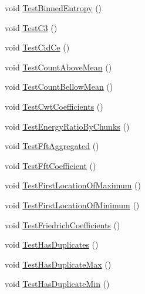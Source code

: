\begin{DoxyCompactItemize}
void \mbox{\hyperlink{classkhiva_1_1features_1_1tests_1_1_features_tests_aaf8462c5c69cbccec585ba6d4db466c4}{Test\+Binned\+Entropy}} ()
\item 
void \mbox{\hyperlink{classkhiva_1_1features_1_1tests_1_1_features_tests_af5f3a7f86324b5021d03266a97ea4935}{Test\+C3}} ()
\item 
void \mbox{\hyperlink{classkhiva_1_1features_1_1tests_1_1_features_tests_aced6b4f866c47c52d54c31dd540336b0}{Test\+Cid\+Ce}} ()
\item 
void \mbox{\hyperlink{classkhiva_1_1features_1_1tests_1_1_features_tests_a1c4531b9f4a2d4517772c67a7567a609}{Test\+Count\+Above\+Mean}} ()
\item 
void \mbox{\hyperlink{classkhiva_1_1features_1_1tests_1_1_features_tests_a2c56c2fbd90c545bfd5ca49c32073c0d}{Test\+Count\+Bellow\+Mean}} ()
\item 
void \mbox{\hyperlink{classkhiva_1_1features_1_1tests_1_1_features_tests_a6a5bdcc5e0cb17a89dab77b3f730a99d}{Test\+Cwt\+Coefficients}} ()
\item 
void \mbox{\hyperlink{classkhiva_1_1features_1_1tests_1_1_features_tests_ab77e9561c77d20e7a1062f6a4bdfbf2c}{Test\+Energy\+Ratio\+By\+Chunks}} ()
\item 
void \mbox{\hyperlink{classkhiva_1_1features_1_1tests_1_1_features_tests_ae34de6e83714e5da8810988664149b62}{Test\+Fft\+Aggregated}} ()
\item 
void \mbox{\hyperlink{classkhiva_1_1features_1_1tests_1_1_features_tests_a4c173947fd8938ffb388badccac937d6}{Test\+Fft\+Coefficient}} ()
\item 
void \mbox{\hyperlink{classkhiva_1_1features_1_1tests_1_1_features_tests_a85f6553aca92db824383cdded5a4f211}{Test\+First\+Location\+Of\+Maximum}} ()
\item 
void \mbox{\hyperlink{classkhiva_1_1features_1_1tests_1_1_features_tests_af045e5c50dc093d9fda1a4434345e098}{Test\+First\+Location\+Of\+Minimum}} ()
\item 
void \mbox{\hyperlink{classkhiva_1_1features_1_1tests_1_1_features_tests_a59288a7aa65107014a1f5088aafd50b7}{Test\+Friedrich\+Coefficients}} ()
\item 
void \mbox{\hyperlink{classkhiva_1_1features_1_1tests_1_1_features_tests_a28b1f0dae64f93dbf7ff4e0ed25c7d10}{Test\+Has\+Duplicates}} ()
\item 
void \mbox{\hyperlink{classkhiva_1_1features_1_1tests_1_1_features_tests_ad72a83083060a305e82b6d08cd39a23c}{Test\+Has\+Duplicate\+Max}} ()
\item 
void \mbox{\hyperlink{classkhiva_1_1features_1_1tests_1_1_features_tests_a1f3ea2c6e586090d937f17a268e1086a}{Test\+Has\+Duplicate\+Min}} ()

\end{DoxyCompactItemize}

